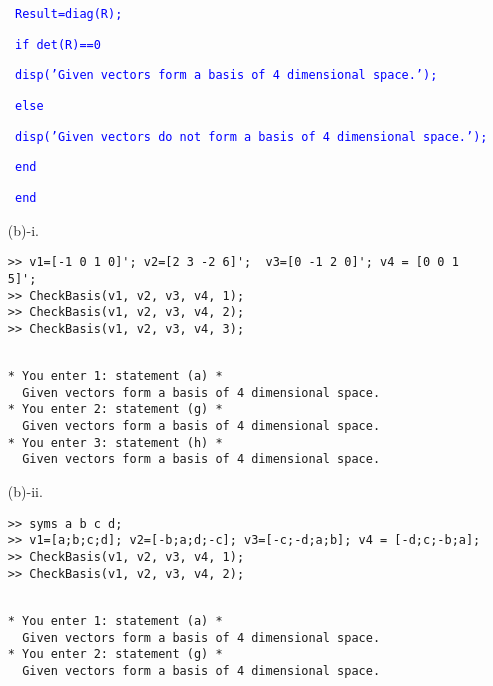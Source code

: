 \begin{sol}
\begin{enumerate}
\textcolor{blue}{\texttt{  \hspace{8mm}            Result=diag(R);}}

\textcolor{blue}{\texttt{  \hspace{8mm}         if det(R)==0}}

\textcolor{blue}{\texttt{   \hspace{12mm}       disp('Given vectors form a basis of 4 dimensional space.');}}

\textcolor{blue}{\texttt{  \hspace{8mm}              else}}

 \textcolor{blue}{\texttt{  \hspace{12mm}               disp('Given vectors do not form a basis of 4 dimensional space.');}}

\textcolor{blue}{\texttt{  \hspace{8mm}        end}}

\textcolor{blue}{\texttt{  \hspace{4mm}      end}}


\item[(b)-i.] 
\begin{verbatim}
>> v1=[-1 0 1 0]'; v2=[2 3 -2 6]';  v3=[0 -1 2 0]'; v4 = [0 0 1 5]';
>> CheckBasis(v1, v2, v3, v4, 1);
>> CheckBasis(v1, v2, v3, v4, 2);
>> CheckBasis(v1, v2, v3, v4, 3);
\end{verbatim}

\begin{outputs}
\begin{verbatim}

* You enter 1: statement (a) *
  Given vectors form a basis of 4 dimensional space.
* You enter 2: statement (g) *
  Given vectors form a basis of 4 dimensional space.
* You enter 3: statement (h) *
  Given vectors form a basis of 4 dimensional space.
\end{verbatim}
\end{outputs}

\item[(b)-ii.] 
\begin{verbatim}
>> syms a b c d;
>> v1=[a;b;c;d]; v2=[-b;a;d;-c]; v3=[-c;-d;a;b]; v4 = [-d;c;-b;a];
>> CheckBasis(v1, v2, v3, v4, 1);
>> CheckBasis(v1, v2, v3, v4, 2);
\end{verbatim}

\begin{outputs}
\begin{verbatim}

* You enter 1: statement (a) *
  Given vectors form a basis of 4 dimensional space.
* You enter 2: statement (g) *
  Given vectors form a basis of 4 dimensional space.
\end{verbatim}
\end{outputs}
\end{enumerate}
\end{sol}



